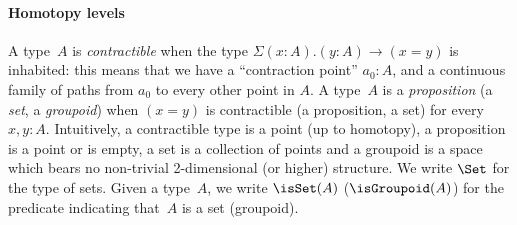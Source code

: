\paragraph{Homotopy levels}
A type~$A$ is \emph{contractible} when the type $\Sigma(x:A).(y:A)\to(x=y)$ is
inhabited: this means that we have a ``contraction point'' $a_0 : A$, and a
continuous family of paths from $a_0$ to every other point in $A$.
%
A type~$A$ is a \emph{proposition} (\resp a \emph{set}, \resp a
\emph{groupoid}) when $(x=y)$ is contractible (\resp a proposition, \resp a
set) for every $x,y:A$. Intuitively, a contractible type is a point (up to
homotopy), a proposition is a point or is empty, a set is a collection of points
and a groupoid is a space which bears no non-trivial 2-dimensional (or higher)
structure.
%
We write $\Set$ for the type of sets. Given a type~$A$, we write $\isSet(A)$ (\resp $\isGroupoid(A)$) for the predicate indicating that~$A$ is a set (\resp groupoid).

